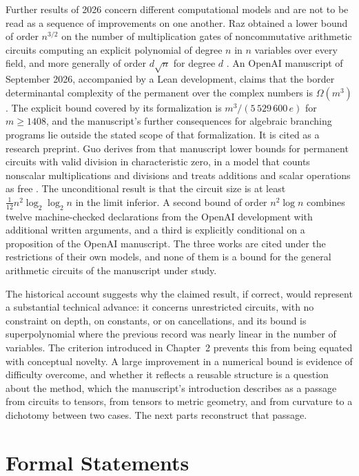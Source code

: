\documentclass[11pt,letterpaper]{report}
\theoremstyle{plain}
\theoremstyle{definition}
\theoremstyle{remark}
\begin{document}
Further results of 2026 concern different computational models and are not to be read as a sequence of improvements on one another. Raz obtained a lower bound of order $n^{3/2}$ on the number of multiplication gates of noncommutative arithmetic circuits computing an explicit polynomial of degree $n$ in $n$ variables over every field, and more generally of order $d\sqrt n$ for degree $d$ \cite{Raz2026}. An OpenAI manuscript of September 2026, accompanied by a Lean development, claims that the border determinantal complexity of the permanent over the complex numbers is $\Omega(m^3)$ \cite{OpenAI2026}. The explicit bound covered by its formalization is $m^3/(5\,529\,600\,e)$ for $m\ge1408$, and the manuscript's further consequences for algebraic branching programs lie outside the stated scope of that formalization. It is cited as a research preprint. Guo derives from that manuscript lower bounds for permanent circuits with valid division in characteristic zero, in a model that counts nonscalar multiplications and divisions and treats additions and scalar operations as free \cite{Guo2026}. The unconditional result is that the circuit size is at least $\tfrac1{12}n^2\log_2\log_2n$ in the limit inferior. A second bound of order $n^2\log n$ combines twelve machine-checked declarations from the OpenAI development with additional written arguments, and a third is explicitly conditional on a proposition of the OpenAI manuscript. The three works are cited under the restrictions of their own models, and none of them is a bound for the general arithmetic circuits of the manuscript under study.

The historical account suggests why the claimed result, if correct, would represent a substantial technical advance: it concerns unrestricted circuits, with no constraint on depth, on constants, or on cancellations, and its bound is superpolynomial where the previous record was nearly linear in the number of variables. The criterion introduced in Chapter~2 prevents this from being equated with conceptual novelty. A large improvement in a numerical bound is evidence of difficulty overcome, and whether it reflects a reusable structure is a question about the method, which the manuscript's introduction describes as a passage from circuits to tensors, from tensors to metric geometry, and from curvature to a dichotomy between two cases. The next parts reconstruct that passage.

\section{Formal Statements}
\end{document}
